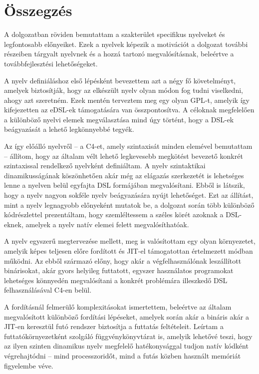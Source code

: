 \chapter*{Összegzés}

A dolgozatban röviden bemutattam a szakterület specifikus nyelveket és legfontosabb előnyeiket.
Ezek a nyelvek képezik a motivációt a dolgozat további részeiben tárgyalt nyelvnek és a hozzá tartozó megvalósításnak, beleértve a továbbfejlesztési lehetőségeket.

A nyelv definiáláshoz első lépésként bevezettem azt a négy fő követelményt, amelyek biztosítják, hogy az elkészült nyelv olyan módon fog tudni viselkedni, ahogy azt szeretném.
Ezek mentén terveztem meg egy olyan \gls{GPL}-t, amelyik így kifejezetten az \gls{eDSL}-ek támogatására van összpontosítva.
A céloknak megfelelően a különböző nyelvi elemek megválasztása mind úgy történt, hogy a \gls{DSL}-ek beágyazását a lehető legkönnyebbé tegyék.

Az így előálló nyelvről -- a C4-et, amely szintaxisát minden elemével bemutattam -- állítom, hogy az általam vélt lehető legkevesebb megkötést bevezető konkrét szintaxissal rendelkező nyelvként definiáltam.
A nyelv szintaktikai dinamikusságának köszönhetően akár még az elágazás szerkezetét is lehetséges lenne a nyelven belül egyfajta \gls{DSL} formájában megvalósítani.
Ebből is látszik, hogy a nyelv nagyon sokféle nyelv beágyazására nyújt lehetőséget.
Ezt az állítást, mint a nyelv legnagyobb előnyeként mutatok be, a dolgozat során több különböző kódrészlettel prezentáltam, hogy szemléltessem a széles körét azoknak a \gls{DSL}-eknek, amelyek a nyelv natív elemei felett megvalósíthatóak.

A nyelv egyszerű megtervezése mellett, meg is valósítottam egy olyan környezetet, amelyik képes teljesen előre fordított és \gls{JIT}-el támogatottan értelmezett módban működni.
Az ebből származó előny, hogy akár a végfelhasználónak leszállított binárisokat, akár gyors helyileg futtatott, egyszer használatos programokat lehetséges könnyedén megvalósítani a konkrét problémára illeszkedő \gls{DSL} felhasználásával C4-en belül.

A fordításnál felmerülő komplexitásokat ismertettem, beleértve az általam megvalósított különböző fordítási lépéseket, amelyek során akár a bináris akár a \gls{JIT}-en keresztül futó rendszer biztosítja a futtatás feltételeit.
Leírtam a futtatókörnyezetként szolgáló függvénykönyvtárat is, amelyik lehetővé teszi, hogy az ilyen szinten dinamikus nyelv megfelelő hatékonysággal tudjon natív kódként végrehajtódni -- mind processzoridőt, mind a futás közben használt memóriát figyelembe véve.


